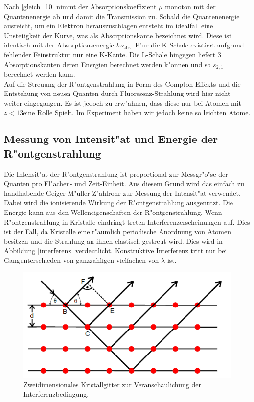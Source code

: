 		Nach \eqref{gleich_10} nimmt der Absorptionskoeffizient $\mu$ monoton mit der Quantenenergie ab und damit die Transmission zu.
		Sobald die Quantenenergie ausreicht, um ein Elektron he\-raus\-zu\-schla\-gen entsteht im idealfall eine Unstetigkeit der Kurve, was als Absorptionskante bezeichnet wird.
		Diese ist identisch mit der Ab\-sorp\-tions\-e\-nergie $h\nu_\mathrm{abs}$.
		F"ur die K-Schale existiert aufgrund fehlender Feinstruktur nur eine K-Kante.
		Die L-Schale hingegen liefert 3 Ab\-sorp\-tions\-kan\-ten deren Energien berechnet werden k"onnen und so $s_{2,1}$ berechnet werden kann.\\
		Auf die Streuung der R"ontgenstrahlung in Form des Compton-Effekts und die Entstehung von neuen Quanten durch Fluoresenz-Strahlung wird hier nicht weiter eingegangen. Es ist jedoch zu erw"ahnen, dass diese nur bei Atomen mit $z < 13$eine Rolle Spielt.
		Im Experiment haben wir jedoch keine so leichten Atome.

	\subsection{Messung von Intensit"at und Energie der R"ontgenstrahlung} 
	\label{sub:messung_von_intensit_at_}
	
	Die Intensit"at der R"ontgenstrahlung ist proportional zur Messgr"o"se der Quanten pro Fl"achen- und Zeit-Einheit.
	Aus diesem Grund wird das einfach zu handhabende Geiger-M"uller-Z"ahlrohr zur Messung der Intensit"at verwendet. Dabei wird die ionisierende Wirkung der R"ontgenstrahlung ausgenutzt.
	Die Energie kann aus den Welleneigenschaften der R"ontgenstrahlung.
	Wenn R"ontgenstrahlung in Kristalle eindringt treten In\-ter\-fe\-renz\-er\-schei\-nung\-en auf.
	Dies ist der Fall, da Kristalle eine r"aumlich periodische Anordnung von Atomen besitzen und die Strahlung an ihnen elastisch gestreut wird. Dies wird in Abbildung \eqref{interferenz} verdeutlicht. Konstruktive Interferenz tritt nur bei Gangunterschieden von ganzzahligen vielfachen von $\lambda$ ist.

	\begin{figure}[htbp]
		\centering
		\includegraphics[width = 12cm]{img/interferenz.PNG}
		\caption{Zweidimensionales Kristallgitter zur Veranschaulichung der Interferenzbedingung. \cite{anleitung}}
		\label{interferenz}
	\end{figure}

